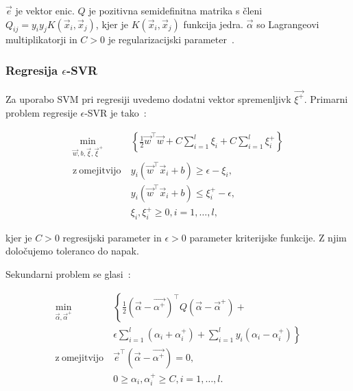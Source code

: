 {$\vec{e}$ je vektor enic. $Q$ je pozitivna semidefinitna matrika s členi $Q_{ij} = y_i y_jK(\vec{x}_i,\vec{x}_j)$, kjer je $K(\vec{x}_i,\vec{x}_j)$ funkcija jedra. $\vec{\alpha}$ so Lagrangeovi multiplikatorji in $C>0$ je regularizacijski parameter~\cite{chang2011a}.








\subsubsection{Regresija \texorpdfstring{$\epsilon$}{e}-SVR}

Za uporabo SVM pri regresiji uvedemo dodatni vektor spremenljivk $\vec{\xi^+}$. Primarni problem regresije $\epsilon$-SVR je  tako~\cite{chang2011a}:

\begin{equation}\label{eq:e-svr-primal}
\begin{aligned}
\min_{\vec{w}, b, \vec{\xi}, \vec{\xi}^+} &~ \left\{ \frac{1}{2} \vec{w}^\top\vec{w} + C \sum_{i=1}^l\xi_i + C \sum_{i=1}^l\xi_i^+ \right\}\\
    \mathrm{z~omejitvijo} &~ y_i \left( \vec{w}^\top \vec{x}_i + b \right) \geq \epsilon - \xi_i,\\
    &~  y_i \left( \vec{w}^\top \vec{x}_i + b \right) \leq \xi_i^+ - \epsilon, \\
    &~  \xi_i,\xi_i^+ \geq 0, i=1, \ldots, l,
\end{aligned}	
\end{equation}

kjer je $C>0$ regresijski parameter in $\epsilon > 0$ parameter kriterijske funkcije. Z njim določujemo toleranco do napak.

Sekundarni problem se glasi~\cite{chang2011a}:

\begin{equation}\label{eq:e-svr-dual}
\begin{aligned}
\min_{\vec{\alpha}, \vec{\alpha}^+} &~ \left\{ \frac{1}{2} (\vec{\alpha} - \vec{\alpha^ +})^\top Q (\vec{\alpha} - \vec{\alpha}^+) +\right. \\
&~ \left.\epsilon \sum_{i=1}^l\left( \alpha_i + \alpha_i^+ \right) + \sum_{i=1}^l y_i\left( \alpha_i - \alpha_i^+ \right) \right\}\\
    \mathrm{z~omejitvijo} &~ 
    \vec{e}^\top \left(\vec{\alpha} - \vec{\alpha^+} \right) = 0,\\
    &~ 0 \geq \alpha_i, \alpha_i^+ \geq C, i=1, \ldots, l.
\end{aligned}	
\end{equation}

}
